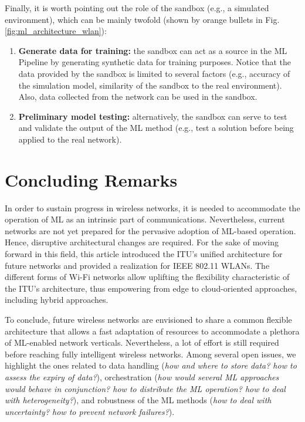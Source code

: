 \documentclass[twocolumn]{article}
\begin{document}
Finally, it is worth pointing out the role of the sandbox (e.g., a simulated environment), which can be mainly twofold (shown by orange bullets in Fig. \ref{fig:ml_architecture_wlan}):
\begin{enumerate}
    \item \textbf{Generate data for training:} the sandbox can act as a source in the ML Pipeline by generating synthetic data for training purposes. Notice that the data provided by the sandbox is limited to several factors (e.g., accuracy of the simulation model, similarity of the sandbox to the real environment). Also, data collected from the network can be used in the sandbox.
    \item \textbf{Preliminary model testing:} alternatively, the sandbox can serve to test and validate the output of the ML method (e.g., test a solution before being applied to the real network).
\end{enumerate}

\section{Concluding Remarks}
In order to sustain progress in wireless networks, it is needed to accommodate the operation of ML as an intrinsic part of communications. Nevertheless, current networks are not yet prepared for the pervasive adoption of ML-based operation. Hence, disruptive architectural changes are required. For the sake of moving forward in this field, this article introduced the ITU's unified architecture for future networks and provided a realization for IEEE 802.11 WLANs. The different forms of Wi-Fi networks allow uplifting the flexibility characteristic of the ITU's architecture, thus empowering from edge to cloud-oriented approaches, including hybrid approaches.

To conclude, future wireless networks are envisioned to share a common flexible architecture that allows a fast adaptation of resources to accommodate a plethora of ML-enabled network verticals. Nevertheless, a lot of effort is still required before reaching fully intelligent wireless networks. Among several open issues, we highlight the ones related to data handling (\textit{how and where to store data? how to assess the expiry of data?}), orchestration (\textit{how would several ML approaches would behave in conjunction? how to distribute the ML operation? how to deal with heterogeneity?}), and robustness of the ML methods (\textit{how to deal with uncertainty? how to prevent network failures?}). 
\end{document}
